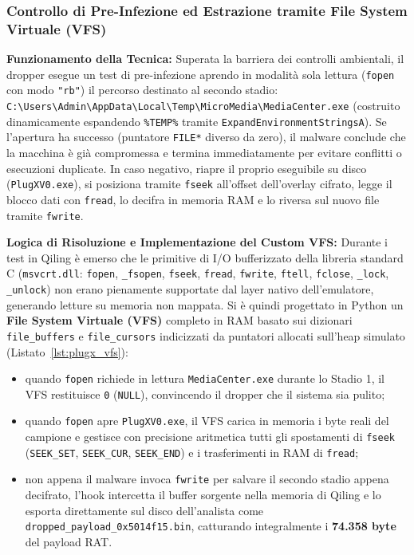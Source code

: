 \documentclass[11pt, a4paper]{article}
\begin{document}
\subsubsection{Controllo di Pre-Infezione ed Estrazione tramite File System Virtuale (VFS)}

\textbf{Funzionamento della Tecnica:} Superata la barriera dei controlli ambientali, il dropper esegue un test di pre-infezione aprendo in modalit\`a sola lettura (\texttt{fopen} con modo \texttt{"rb"}) il percorso destinato al secondo stadio: \texttt{C:\textbackslash\allowbreak{}Users\textbackslash\allowbreak{}Admin\textbackslash\allowbreak{}App\allowbreak{}Data\textbackslash\allowbreak{}Local\textbackslash\allowbreak{}Temp\textbackslash\allowbreak{}Micro\allowbreak{}Media\textbackslash\allowbreak{}Media\allowbreak{}Center.\allowbreak{}exe} (costruito dinamicamente espandendo \texttt{\%TEMP\%} tramite \texttt{Expand\allowbreak{}Environment\allowbreak{}StringsA}). Se l'apertura ha successo (puntatore \texttt{FILE*} diverso da zero), il malware conclude che la macchina \`e gi\`a compromessa e termina immediatamente per evitare conflitti o esecuzioni duplicate. In caso negativo, riapre il proprio eseguibile su disco (\texttt{PlugXV0.exe}), si posiziona tramite \texttt{fseek} all'offset dell'overlay cifrato, legge il blocco dati con \texttt{fread}, lo decifra in memoria RAM e lo riversa sul nuovo file tramite \texttt{fwrite}.

\textbf{Logica di Risoluzione e Implementazione del Custom VFS:} Durante i test in Qiling \`e emerso che le primitive di I/O bufferizzato della libreria standard C (\texttt{msvcrt.dll}: \texttt{fopen}, \texttt{\_fsopen}, \texttt{fseek}, \texttt{fread}, \texttt{fwrite}, \texttt{ftell}, \texttt{fclose}, \texttt{\_lock}, \texttt{\_unlock}) non erano pienamente supportate dal layer nativo dell'emulatore, generando letture su memoria non mappata. Si \`e quindi progettato in Python un \textbf{File System Virtuale (VFS)} completo in RAM basato sui dizionari \texttt{file\_\allowbreak{}buffers} e \texttt{file\_\allowbreak{}cursors} indicizzati da puntatori allocati sull'heap simulato (Listato~\ref{lst:plugx_vfs}):
\begin{itemize}
	\item quando \texttt{fopen} richiede in lettura \texttt{Media\allowbreak{}Center.\allowbreak{}exe} durante lo Stadio 1, il VFS restituisce \texttt{0} (\texttt{NULL}), convincendo il dropper che il sistema sia pulito;
	\item quando \texttt{fopen} apre \texttt{PlugXV0.exe}, il VFS carica in memoria i byte reali del campione e gestisce con precisione aritmetica tutti gli spostamenti di \texttt{fseek} (\texttt{SEEK\_SET}, \texttt{SEEK\_CUR}, \texttt{SEEK\_END}) e i trasferimenti in RAM di \texttt{fread};
	\item non appena il malware invoca \texttt{fwrite} per salvare il secondo stadio appena decifrato, l'hook intercetta il buffer sorgente nella memoria di Qiling e lo esporta direttamente sul disco dell'analista come \texttt{dropped\_\allowbreak{}payload\_\allowbreak{}0x5014f15.\allowbreak{}bin}, catturando integralmente i \textbf{74.358 byte} del payload RAT.
\end{itemize}
\end{document}
